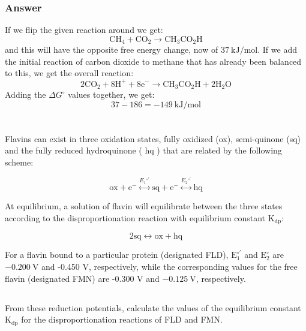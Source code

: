 \documentclass[12pt]{article}
\begin{document}
\subsubsection{Answer}
If we flip the given reaction around we get:
\begin{equation}
\mathrm{CH}_{4}+\mathrm{CO}_{2}\rightarrow \mathrm{CH}_{3} \mathrm{CO}_{2} \mathrm{H}
\end{equation}
and this will have the opposite free energy change, now of $37 \mathrm{~kJ} / \mathrm{mol}$. If we add the initial reaction of carbon dioxide to methane that has already been balanced to this, we get the overall reaction:
\begin{equation}
2 \mathrm{CO}_{2}+8 \mathrm{H}^{+}+8 \mathrm{e}^{-} \rightarrow \mathrm{CH}_{3} \mathrm{CO}_{2} \mathrm{H} +2 \mathrm{H}_{2} \mathrm{O}
\end{equation}
Adding the $\Delta G^{\circ}$ values together, we get:
\begin{equation}
37-186 = -149 \mathrm{~kJ} / \mathrm{mol}
\end{equation}



\section{}
Flavins can exist in three oxidation states, fully oxidized (ox), semi-quinone (sq) and the fully reduced hydroquinone ( $\mathrm{hq}$ ) that are related by the following scheme:

$$
\mathrm{ox}+\mathrm{e}^{-} \stackrel{E_{1}{ }^{\circ \prime}}{\longleftrightarrow} \mathrm{sq}+\mathrm{e}^{-} \stackrel{E_{2}{ }^{\circ \prime}}{\longleftrightarrow} \mathrm{hq}
$$

At equilibrium, a solution of flavin will equilibrate between the three states according to the disproportionation reaction with equilibrium constant $\mathrm{K}_{\mathrm{dp}}$:

$$
2 \mathrm{sq} \leftrightarrow \mathrm{ox}+\mathrm{hq}
$$

For a flavin bound to a particular protein (designated FLD), $\mathrm{E}_{1}^{\circ \prime}$ and $\mathrm{E}_{2}^{\circ}$ are $-0.200 \mathrm{~V}$ and -0.450 $\mathrm{V}$, respectively, while the corresponding values for the free flavin (designated FMN) are -0.300 $\mathrm{V}$ and $-0.125 \mathrm{~V}$, respectively.
\subsection{}
From these reduction potentials, calculate the values of the equilibrium constant $\mathrm{K}_{\mathrm{dp}}$ for the disproportionation reactions of FLD and FMN.
\end{document}
